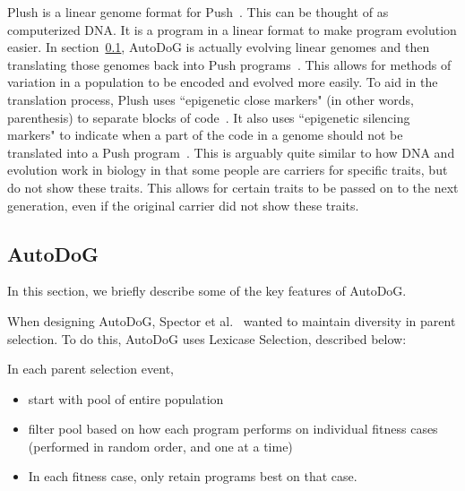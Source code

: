 \documentclass{sig-alternate}
\begin{document}
Plush is a linear genome format for Push~\cite{spector:2016}. This can be thought of as computerized DNA. It is a program in a linear format to make program evolution easier.
In section~\ref{sec:autodog}, AutoDoG is actually evolving linear genomes and then translating those genomes back into Push programs~\cite{spector:2016}. This allows for methods of variation in a population to be encoded and evolved more easily. To aid in the translation process, Plush uses ``epigenetic close markers" (in other words, parenthesis) to separate blocks of code~\cite{spector:2016}. It also uses ``epigenetic silencing markers" to indicate when a part of the code in a genome should not be translated into a Push program~\cite{spector:2016}. This is arguably quite similar to how DNA and evolution work in biology in that some people are carriers for specific traits, but do not show these traits. This allows for certain traits to be passed on to the next generation, even if the original carrier did not show these traits.

\subsection{AutoDoG}
\label{sec:autodog}
In this section, we briefly describe some of the key features of AutoDoG.

When designing AutoDoG, Spector et al.~\cite{spector:2016} wanted to maintain diversity in parent selection. To do this, AutoDoG uses Lexicase Selection, described below: 

In each parent selection event,
\begin{itemize}
	\item start with pool of entire population
	\item filter pool based on how each program performs on individual fitness cases (performed in random order, and one at a time)
	\item In each fitness case, only retain programs best on that case.
\end{itemize}
\end{document}
